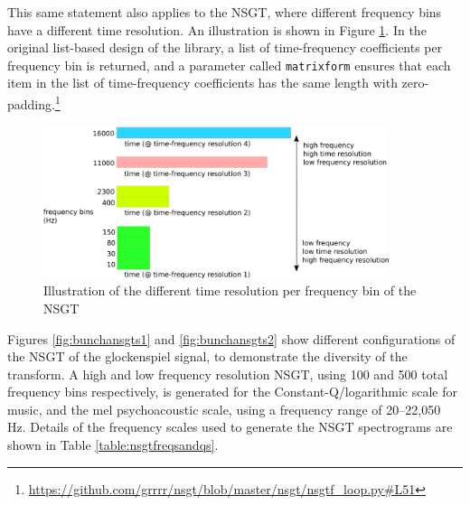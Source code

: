 \documentclass[report.tex]{subfiles}
\begin{document}
This same statement also applies to the NSGT, where different frequency bins have a different time resolution. An illustration is shown in Figure \ref{fig:raggedslicqt}. In the original list-based design of the library, a list of time-frequency coefficients per frequency bin is returned, and a parameter called \Verb#matrixform# ensures that each item in the list of time-frequency coefficients has the same length with zero-padding.\footnote{\url{https://github.com/grrrr/nsgt/blob/master/nsgt/nsgtf_loop.py\#L51}}

\begin{figure}[ht]
	\centering
	\includegraphics[width=0.9\textwidth]{./images-misc/slicq_shape.png}
	\caption{Illustration of the different time resolution per frequency bin of the NSGT}
	\label{fig:raggedslicqt}
\end{figure}

Figures \ref{fig:bunchansgts1} and \ref{fig:bunchansgts2} show different configurations of the NSGT of the glockenspiel signal, to demonstrate the diversity of the transform. A high and low frequency resolution NSGT, using 100 and 500 total frequency bins respectively, is generated for the Constant-Q/logarithmic scale for music, and the mel psychoacoustic scale, using a frequency range of 20--22,050 Hz. Details of the frequency scales used to generate the NSGT spectrograms are shown in Table \ref{table:nsgtfreqsandqs}.
\end{document}

